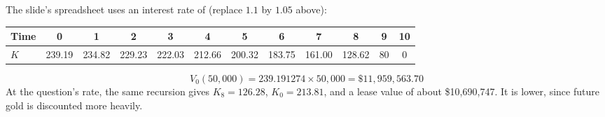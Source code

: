 \begin{example}
    The slide's spreadsheet uses an interest rate of  (replace $1.1$ by $1.05$ above):
    \begin{center}
    \setlength{\tabcolsep}{4pt}
    \begin{tabular}{lccccccccccc}
        \toprule
        Time & 0 & 1 & 2 & 3 & 4 & 5 & 6 & 7 & 8 & 9 & 10\\
        \midrule
        $K$ & 239.19 & 234.82 & 229.23 & 222.03 & 212.66 & 200.32 & 183.75 & 161.00 & 128.62 & 80 & 0\\
        \bottomrule
    \end{tabular}
    \end{center}
    \[V_0(50{,}000) = 239.191274 \times 50{,}000 = \boxed{\$11{,}959{,}563.70}\]
    At the question's  rate, the same recursion gives $K_8 = 126.28$, $K_0 = 213.81$, and a lease value of about \$10,690,747. It is lower, since future gold is discounted more heavily.
\end{example}
